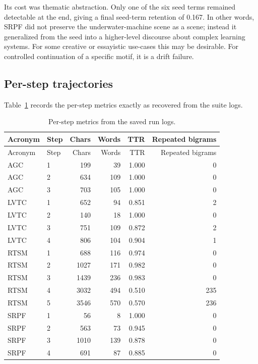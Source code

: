 \documentclass[11pt]{article}
\begin{document}
Its cost was thematic abstraction. Only one of the six seed terms remained detectable at the end, giving a final seed-term retention of 0.167. In other words, SRPF did not preserve the underwater-machine scene as a scene; instead it generalized from the seed into a higher-level discourse about complex learning systems. For some creative or essayistic use-cases this may be desirable. For controlled continuation of a specific motif, it is a drift failure.

\subsection{Per-step trajectories}
Table~\ref{tab:stepmetrics} records the per-step metrics exactly as recovered from the suite logs.

\begin{longtable}{@{}llrrrr@{}}
\caption{Per-step metrics from the saved run logs.}\label{tab:stepmetrics}\\
\toprule
Acronym & Step & Chars & Words & TTR & Repeated bigrams \\
\midrule
\endfirsthead
\toprule
Acronym & Step & Chars & Words & TTR & Repeated bigrams \\
\midrule
\endhead
AGC & 1 & 199 & 39 & 1.000 & 0 \\
AGC & 2 & 634 & 109 & 1.000 & 0 \\
AGC & 3 & 703 & 105 & 1.000 & 0 \\
LVTC & 1 & 652 & 94 & 0.851 & 2 \\
LVTC & 2 & 140 & 18 & 1.000 & 0 \\
LVTC & 3 & 751 & 109 & 0.872 & 2 \\
LVTC & 4 & 806 & 104 & 0.904 & 1 \\
RTSM & 1 & 688 & 116 & 0.974 & 0 \\
RTSM & 2 & 1027 & 171 & 0.982 & 0 \\
RTSM & 3 & 1439 & 236 & 0.983 & 0 \\
RTSM & 4 & 3032 & 494 & 0.510 & 235 \\
RTSM & 5 & 3546 & 570 & 0.570 & 236 \\
SRPF & 1 & 56 & 8 & 1.000 & 0 \\
SRPF & 2 & 563 & 73 & 0.945 & 0 \\
SRPF & 3 & 1010 & 139 & 0.878 & 0 \\
SRPF & 4 & 691 & 87 & 0.885 & 0 \\
\bottomrule
\end{longtable}
\end{document}
